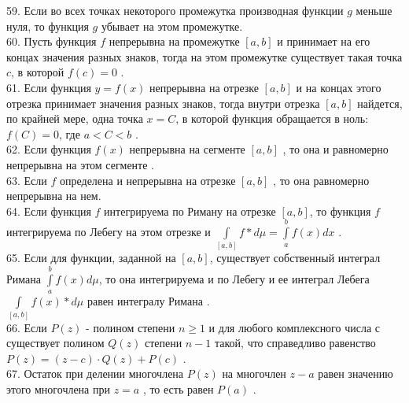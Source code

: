 \documentclass[12pt]{article}
\begin{document}
59. Если во всех точках некоторого промежутка производная функции ${\displaystyle g}$ меньше нуля, то функция ${\displaystyle g}$ убывает на этом промежутке.\\

60. Пусть функция ${\displaystyle f}$  непрерывна на промежутке ${\displaystyle [a,b]}$ и принимает на его концах значения разных знаков, тогда на этом промежутке существует такая точка  ${\displaystyle c}$, в которой ${\displaystyle f(c)=0}$ .\\

61. Если функция ${\displaystyle y = f(x)}$ непрерывна на отрезке ${\displaystyle [a,b]}$ и на концах этого отрезка принимает значения разных знаков, тогда внутри отрезка ${\displaystyle [a,b]}$ найдется, по крайней мере, одна точка ${\displaystyle x = C}$, в которой функция обращается в ноль: ${\displaystyle f(C) = 0}$, где ${\displaystyle a < C< b}$ .\\

62. Если функция ${\displaystyle f(x)}$ непрерывна на сегменте ${\displaystyle [a,b]}$ , то она и равномерно непрерывна на этом сегменте .\\

63. Если ${\displaystyle f}$ определена и непрерывна на отрезке ${\displaystyle [a,b]}$ , то она равномерно непрерывна на нем.\\

64. Если функция ${\displaystyle f}$ интегрируема по Риману на отрезке ${\displaystyle [a,b]}$, то функция ${\displaystyle f}$ интегрируема по Лебегу на этом отрезке и ${\displaystyle \int \limits _{[a,b]} f*d\mu=\int \limits _{a}^{b} f(x) dx}$ .\\

65. Если для функции, заданной на ${\displaystyle [a,b]}$, существует собственный интеграл Римана ${\displaystyle \int \limits _{a}^{b} f(x)d\mu}$, то она интегрируема и по Лебегу и ее интеграл Лебега ${\displaystyle \int \limits _{[a,b]} f(x)*d\mu}$ равен интегралу Римана .\\

66. Если ${\displaystyle P(z)}$ - полином степени ${\displaystyle n \geq 1}$ и для любого комплексного числа ${\displaystyle с}$ существует полином ${\displaystyle Q(z)}$ степени ${\displaystyle n-1}$ такой, что справедливо равенство ${\displaystyle P(z)=(z-c)\cdot Q(z)+P(c)}$ .\\

67. Остаток при делении многочлена ${\displaystyle P(z)}$ на многочлен ${\displaystyle z-a}$ равен значению этого многочлена при ${\displaystyle z=a}$ , то есть равен ${\displaystyle P(a)}$ .\\
\end{document}
